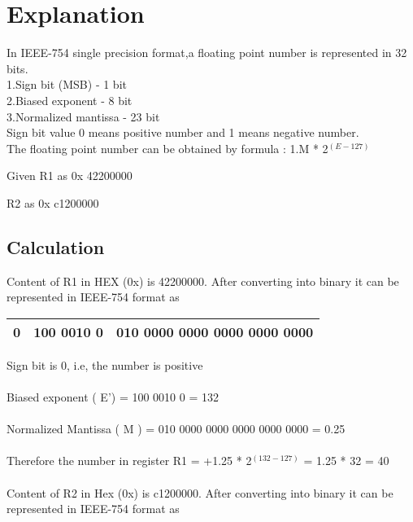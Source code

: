 \documentclass[journal,12pt,twocolumn]{IEEEtran}
\begin{document}
\section{Explanation}

In IEEE-754 single precision format,a floating point number is represented in 32 bits.
\\

1.Sign bit (MSB) - 1 bit
\\
2.Biased exponent - 8 bit
\\
3.Normalized mantissa - 23 bit
\\

Sign bit value 0 means positive number and 1 means negative number.
\\

The floating point number can be obtained by formula : \pm 1.M * 2$ ^ (E-127)$




Given R1 as 0x 42200000

R2 as 0x c1200000

\subsection{Calculation}


Content of R1 in HEX (0x) is 42200000. After converting into binary it can be represented in IEEE-754 format as 
\\


\begin{center}
\begin{tabular}{ |c|c|c| } 
 \hline
 0 & 100 0010 0 & 010 0000 0000 0000 0000 0000 \\ 
  
 \hline
\end{tabular}
\end{center}



Sign bit is 0, i.e, the number is positive
\\
\\
Biased exponent ( E') = 100 0010 0 = 132
\\
\\
Normalized Mantissa ( M ) = 010 0000 0000 0000 0000 0000 = 0.25
\\
\\
Therefore the number in register R1 = +1.25 * 2$ ^ ( 132-127)$ =  1.25 * 32 = 40
\\
\\
Content of R2 in Hex (0x) is c1200000.  After converting into binary it can be represented in IEEE-754 format as 
\\
\\
\end{document}
